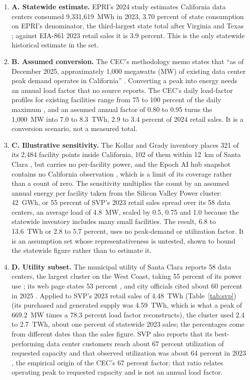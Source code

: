\begin{enumerate}
\item \textbf{A. Statewide estimate.} EPRI's 2024 study estimates California data centers consumed 9,331,619~MWh in 2023, 3.70 percent of state consumption on EPRI's denominator, the third-largest state total after Virginia and Texas \citep[pp.~13, 28]{epri2024}; against EIA-861 2023 retail sales it is 3.9 percent. This is the only statewide historical estimate in the set.
\item \textbf{B. Assumed conversion.} The CEC's methodology memo states that ``as of December 2025, approximately 1,000 megawatts (MW) of existing data center peak demand operates in California'' \citep[pp.~2, 18]{cec_dc_memo2026}. Converting a peak into energy needs an annual load factor that no source reports. The CEC's daily load-factor profiles for existing facilities range from 75 to 100 percent of the daily maximum \citep{cec_prelim2025}, and an assumed annual factor of 0.80 to 0.95 turns the 1,000~MW into 7.0 to 8.3~TWh, 2.9 to 3.4 percent of 2024 retail sales. It is a conversion scenario, not a measured total.
\item \textbf{C. Illustrative sensitivity.} The Kollar and Grady inventory places 321 of its 2,484 facility points inside California, 102 of them within 12~km of Santa Clara \citep{kollar2025}, but carries no per-facility power, and the Epoch AI hub snapshot contains no California observation \citep{epoch2026}, which is a limit of its coverage rather than a count of zero. The sensitivity multiplies the count by an assumed annual energy per facility taken from the Silicon Valley Power cluster: 42~GWh, or 55 percent of SVP's 2023 retail sales spread over its 58 data centers, an average load of 4.8~MW, scaled by 0.5, 0.75 and 1.0 because the statewide inventory includes many small facilities. The result, 6.8 to 13.6~TWh or 2.8 to 5.7 percent, uses no peak-demand or utilization factor. It is an assumption set whose representativeness is untested, shown to bound the statewide figure rather than to estimate it.
\item \textbf{D. Utility subset.} The municipal utility of Santa Clara reports 58 data centers, the largest cluster on the West Coast, taking 55 percent of its power use \citep{svp_assembly2026}; its web page states 53 percent \citep{svp_dcpage}, and city officials cited about 60 percent in 2025 \citep{sjspotlight2025}. Applied to SVP's 2023 retail sales of 4.48~TWh (Table~\ref{tab:svp}) \citep{svp_factsheets} (its purchased and generated supply was 4.59~TWh, which is what a peak of 669.2~MW times a 78.3 percent load factor reconstructs), the cluster used 2.4 to 2.7~TWh, about one percent of statewide 2023 sales; the percentages come from different dates than the sales figure. SVP also reports that its best-performing data center customers reach about 67 percent utilization of requested capacity and that observed utilization was about 64 percent in 2023 \citep{svp_irp2025}, the empirical origin of the CEC's 67 percent factor; that ratio relates operating peak to requested capacity and is not an annual load factor.
\end{enumerate}

